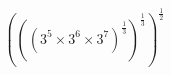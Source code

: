 \documentclass[preview]{standalone}
\begin{document}
\begin{align*}
\left(\left(\left(3^5 \times 3^6 \times 3^7 \right)^\frac{1}{3} \right)^\frac{1}{3} \right)^\frac{1}{2}
\end{align*}
\end{document}
